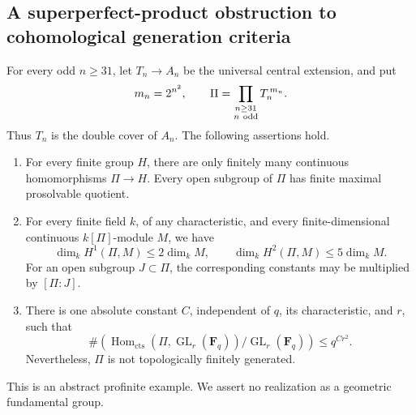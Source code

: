 \subsection{A superperfect-product obstruction to cohomological generation criteria}

\begin{example}
\label{D:superperfect-quadratic-obstruction}
For every odd \(n\geq31\), let \(T_n\to A_n\) be the universal
central extension, and put
\[
 m_n=2^{n^2},\qquad
 \Pi=\prod_{\substack{n\geq31\\ n\ {\rm odd}}}T_n^{\,m_n}.
\]
Thus \(T_n\) is the double cover of \(A_n\).
The following assertions hold.
\begin{enumerate}
\item For every finite group \(H\), there are only finitely many continuous
homomorphisms \(\Pi\to H\).  Every open subgroup of \(\Pi\) has finite
maximal prosolvable quotient.
\item For every finite field \(k\), of any characteristic, and every
finite-dimensional continuous \(k[\Pi]\)-module \(M\), we have
\[
 \dim_k H^1(\Pi,M)\leq2\dim_k M,\qquad
 \dim_k H^2(\Pi,M)\leq5\dim_k M.
 \tag{SP1}
\]
For an open subgroup \(J\subset\Pi\), the corresponding constants
may be multiplied by \([\Pi:J]\).
\item There is one absolute constant \(C\), independent of \(q\), its
characteristic, and \(r\), such that
\[
 \#\left(
 \operatorname{Hom}_{\mathrm{cts}}(\Pi,\operatorname{GL}_r(\mathbf F_q))
 /\operatorname{GL}_r(\mathbf F_q)\right)\leq q^{Cr^2}.
 \tag{SP2}
\]
Nevertheless, \(\Pi\) is not topologically finitely generated.
\end{enumerate}
This is an abstract profinite example.  We assert no realization as
a geometric fundamental group.
\end{example}

